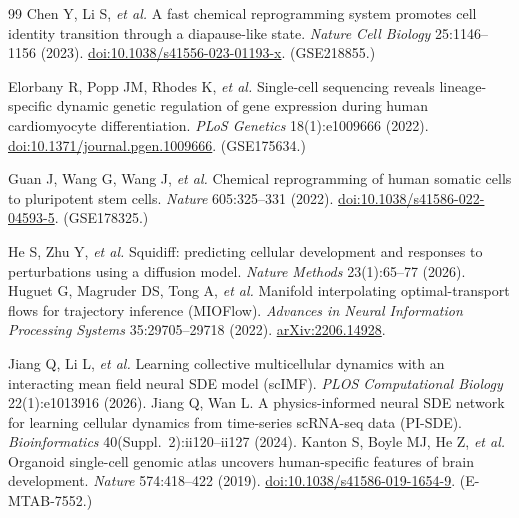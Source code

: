 \documentclass[11pt]{article}
\begin{document}
\begin{thebibliography}{99}
Chen Y, Li S, \emph{et al.}
A fast chemical reprogramming system promotes cell identity transition through a
diapause-like state.
\emph{Nature Cell Biology} 25:1146--1156 (2023).
\href{https://doi.org/10.1038/s41556-023-01193-x}{doi:10.1038/s41556-023-01193-x}.
(GSE218855.)

Elorbany R, Popp JM, Rhodes K, \emph{et al.}
Single-cell sequencing reveals lineage-specific dynamic genetic regulation of gene
expression during human cardiomyocyte differentiation.
\emph{PLoS Genetics} 18(1):e1009666 (2022).
\href{https://doi.org/10.1371/journal.pgen.1009666}{doi:10.1371/journal.pgen.1009666}.
(GSE175634.)

Guan J, Wang G, Wang J, \emph{et al.}
Chemical reprogramming of human somatic cells to pluripotent stem cells.
\emph{Nature} 605:325--331 (2022).
\href{https://doi.org/10.1038/s41586-022-04593-5}{doi:10.1038/s41586-022-04593-5}.
(GSE178325.)

He S, Zhu Y, \emph{et al.} Squidiff: predicting cellular development and responses to
perturbations using a diffusion model. \emph{Nature Methods} 23(1):65--77 (2026).
Huguet G, Magruder DS, Tong A, \emph{et al.}
Manifold interpolating optimal-transport flows for trajectory inference (MIOFlow).
\emph{Advances in Neural Information Processing Systems} 35:29705--29718 (2022).
\href{https://doi.org/10.48550/arXiv.2206.14928}{arXiv:2206.14928}.

Jiang Q, Li L, \emph{et al.} Learning collective multicellular dynamics with an
interacting mean field neural SDE model (scIMF). \emph{PLOS Computational Biology}
22(1):e1013916 (2026).
Jiang Q, Wan L. A physics-informed neural SDE network for learning cellular dynamics
from time-series scRNA-seq data (PI-SDE). \emph{Bioinformatics} 40(Suppl.~2):ii120--ii127 (2024).
Kanton S, Boyle MJ, He Z, \emph{et al.}
Organoid single-cell genomic atlas uncovers human-specific features of brain
development.
\emph{Nature} 574:418--422 (2019).
\href{https://doi.org/10.1038/s41586-019-1654-9}{doi:10.1038/s41586-019-1654-9}.
(E-MTAB-7552.)


\end{thebibliography}
\end{document}
